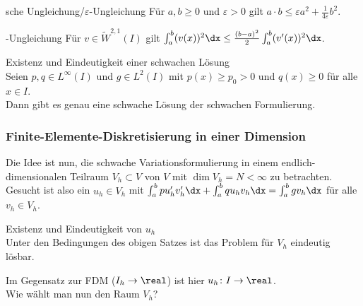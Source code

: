 \linie

\begin{Lemma}{sche Ungleichung/$\varepsilon$-Ungleichung}
    Für $a, b \ge 0$ und $\varepsilon > 0$ gilt
    $a \cdot b \le \varepsilon a^2 + \frac{1}{4\varepsilon} b^2$.
\end{Lemma}

\begin{Lemma}{-Ungleichung}
    Für $v \in \widetilde{W}^{2,1}(I)$ gilt
    $\int_a^b (v(x))^2 \dx \le \frac{(b - a)^2}{2} \int_a^b (v'(x))^2 \dx$.
\end{Lemma}

\begin{Satz}{Existenz und Eindeutigkeit einer schwachen Lösung}\\
    Seien $p, q \in L^\infty(I)$ und $g \in L^2(I)$ mit
    $p(x) \ge p_0 > 0$ und $q(x) \ge 0$ für alle $x \in I$.\\
    Dann gibt es genau eine schwache Lösung der schwachen Formulierung.
\end{Satz}

\subsubsection{%
    Finite-Elemente-Diskretisierung in einer Dimension%
}

\begin{Bem}
    Die Idee ist nun, die schwache Variationsformulierung in einem
    endlich-dimensiona\-len Teilraum $V_h \subset V$ von $V$ mit
    $\dim V_h = N < \infty$ zu betrachten.\\
    Gesucht ist also ein $u_h \in V_h$ mit
    $\int_a^b pu_h'v_h'\dx + \int_a^b qu_hv_h\dx = \int_a^b gv_h\dx$
    für alle $v_h \in V_h$.
\end{Bem}

\begin{Satz}{Existenz und Eindeutigkeit von $u_h$}\\
    Unter den Bedingungen des obigen Satzes ist das Problem für $V_h$
    eindeutig lösbar.
\end{Satz}

\begin{Bem}
    Im Gegensatz zur FDM ($I_h \rightarrow \real$) ist hier
    $u_h\colon I \rightarrow \real$.\\
    Wie wählt man nun den Raum $V_h$?
\end{Bem}

\linie

